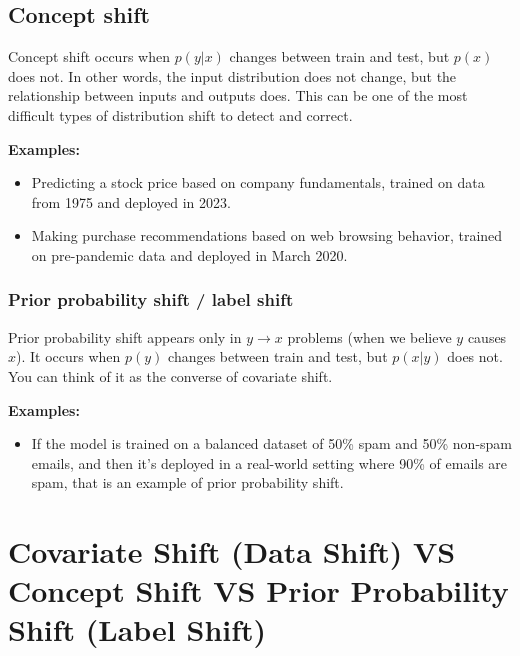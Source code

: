 \subsection{Concept shift}\label{concept_shift}
Concept shift occurs when $p(y|x)$ changes between train and test, but $p(x)$ does not. In other words, the input distribution does not change, but the relationship between inputs and outputs does. This can be one of the most difficult types of distribution shift to detect and correct.

\vspace{0.2cm}
\textbf{Examples:}
\begin{itemize}
    \item Predicting a stock price based on company fundamentals, trained on data from 1975 and deployed in 2023.
    \item Making purchase recommendations based on web browsing behavior, trained on pre-pandemic data and deployed in March 2020.
\end{itemize}

\subsubsection{Prior probability shift / label shift}\label{label_shift}
Prior probability shift appears only in $y \to x$ problems (when we believe $y$ causes $x$). It occurs when $p(y)$ changes between train and test, but $p(x|y)$ does not. You can think of it as the converse of covariate shift.

\vspace{0.2cm}
\textbf{Examples:}
\begin{itemize}
    \item If the model is trained on a balanced dataset of 50\% spam and 50\% non-spam emails, and then it’s deployed in a real-world setting where 90\% of emails are spam, that is an example of prior probability shift.
\end{itemize}

\section{Covariate Shift (Data Shift) VS Concept Shift VS Prior Probability Shift (Label Shift) \cite{chatgpt}}


